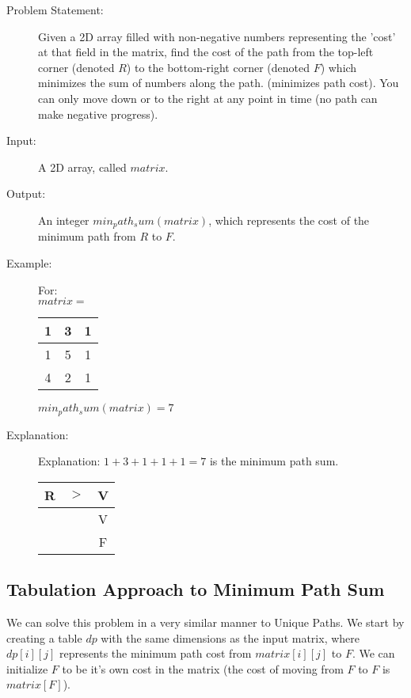 \begin{description}
    \item[Problem Statement:]
        Given a 2D array filled with non-negative numbers representing the 'cost' at that field in the matrix,
        find the cost of the path from the top-left corner (denoted $R$) to the bottom-right corner (denoted $F$) which minimizes the sum of numbers along the path.
        (minimizes path cost).
        You can only move down or to the right at any point in time (no path can make negative progress).

    \item[Input:]
        A 2D array, called $matrix$.
        
    \item[Output:]
        An integer $min_path_sum(matrix)$, which represents the cost of the minimum path from $R$ to $F$.
        
    \item[Example:] For:\\
    $matrix = $
    \begin{table}[H]
        \centering
        \begin{tabular}{|c|c|c|}
            \hline
            1 & 3 & 1 \\
            \hline
            1 & 5 & 1 \\
            \hline
            4 & 2 & 1 \\
            \hline
        \end{tabular}
    \end{table}

    $min_path_sum(matrix) = 7$

    \item[Explanation:]
        Explanation: $1 + 3 + 1 + 1 + 1 = 7$ is the minimum path sum.
        \begin{table}[H]
            \centering
            \begin{tabular}{|c|c|c|}
                \hline
                R & $>$ & V \\
                \hline
                 &  & V \\
                \hline
                 &  & F \\
                \hline
            \end{tabular}
        \end{table}
        
\end{description}

\subsection{Tabulation Approach to Minimum Path Sum}
We can solve this problem in a very similar manner to Unique Paths.
We start by creating a table $dp$ with the same dimensions as the input matrix, where $dp[i][j]$ represents the minimum path cost from $matrix[i][j]$ to $F$.
We can initialize $F$ to be it's own cost in the matrix (the cost of moving from $F$ to $F$ is $matrix[F]$).

